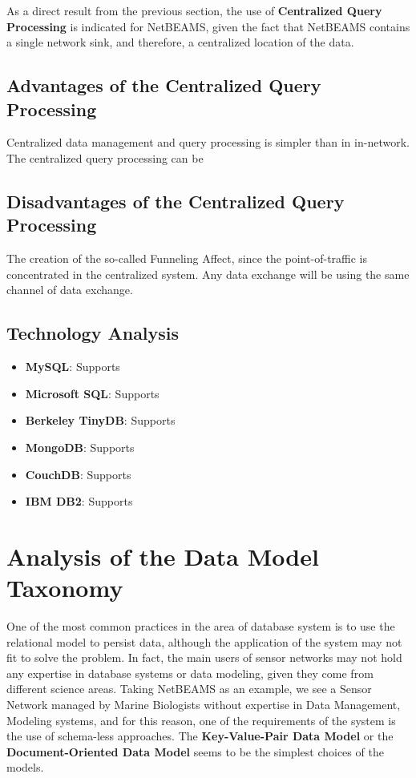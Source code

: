 As a direct result from the previous section, the use of \textbf{Centralized Query
Processing} is indicated for NetBEAMS, given the fact that NetBEAMS contains
a single network sink, and therefore, a centralized location of the data.

\subsection{Advantages of the Centralized Query Processing}

Centralized data management and query processing is simpler than in in-network.
The centralized query processing can be 

\subsection{Disadvantages of the Centralized Query Processing}

The creation of the so-called Funneling Affect, since the point-of-traffic is
concentrated in the centralized system. Any data exchange will be using the
same channel of data exchange.

\subsection{Technology Analysis}

\begin{itemize}
  \item \textbf{MySQL}: Supports
  \item \textbf{Microsoft SQL}: Supports
  \item \textbf{Berkeley TinyDB}: Supports
  \item \textbf{MongoDB}: Supports
  \item \textbf{CouchDB}: Supports
  \item \textbf{IBM DB2}: Supports
\end{itemize}

\section{Analysis of the Data Model Taxonomy}

One of the most common practices in the area of database system is to use the
relational model to persist data, although the application of the system may
not fit to solve the problem. In fact, the main users of sensor networks may
not hold any expertise in database systems or data modeling, given they come
from different science areas. Taking NetBEAMS as an example, we see a Sensor
Network managed by Marine Biologists without expertise in Data Management,
Modeling systems, and for this reason, one of the requirements of the system is
the use of schema-less approaches. The \textbf{Key-Value-Pair Data Model} or the
\textbf{Document-Oriented Data Model} seems to be the simplest choices of the
models.

